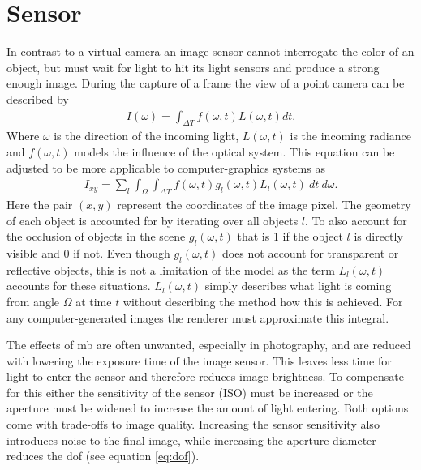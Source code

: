 \section{Sensor}
In contrast to a virtual camera an image sensor cannot interrogate the color of an object, but must wait for light to hit its light sensors and produce a strong enough image.
During the capture of a frame the view of a point camera can be described by
\begin{align}
    I(\omega) = \int_{\Delta T} f(\omega,t) L(\omega,t)dt.
    \label{eq:mb-integral}
\end{align}
Where $\omega$ is the direction of the incoming light, $L(\omega,t)$ is the incoming radiance and $f(\omega,t)$ models the influence of the optical system.
This equation can be adjusted to be more applicable to computer-graphics systems as
\begin{align}
    I_{xy} = \sum_l \int_\Omega \int_{\Delta T} f(\omega, t) g_l(\omega, t) L_l(\omega, t) \: dt \: d\omega.
    \label{eq:mb-cg-integral}
\end{align}
Here the pair $(x,y)$ represent the coordinates of the image pixel.
The geometry of each object is accounted for by iterating over all objects $l$.
To also account for the occlusion of objects in the scene $g_l(\omega, t)$ that is 1 if the object $l$ is directly visible and 0 if not.
Even though $g_l(\omega, t)$ does not account for transparent or reflective objects, this is not a limitation of the model as the term $L_l(\omega, t)$ accounts for these situations.
$L_l(\omega, t)$ simply describes what light is coming from angle $\Omega$ at time $t$ without describing the method how this is achieved. \cite{Navarro.2011}
For any computer-generated images the renderer must approximate this integral.

The effects of \gls{mb} are often unwanted, especially in photography, and are reduced with lowering the exposure time of the image sensor.
This leaves less time for light to enter the sensor and therefore reduces image brightness.
To compensate for this either the sensitivity of the sensor (ISO) must be increased or the aperture must be widened to increase the amount of light entering.
Both options come with trade-offs to image quality.
Increasing the sensor sensitivity also introduces noise to the final image, while increasing the aperture diameter reduces the \gls{dof} (see equation \ref{eq:dof}).


